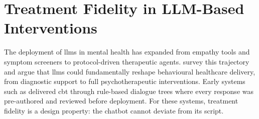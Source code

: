 \section{Treatment Fidelity in LLM-Based Interventions}
\label{sec:bg-llm-healthcare}
%
%
%

The deployment of \glspl{llm} in mental health has expanded from empathy
tools and symptom screeners to protocol-driven therapeutic agents.
\textcite{DTKNEPHQ} survey this trajectory and argue that \glspl{llm} could
fundamentally reshape behavioural healthcare delivery, from diagnostic support
to full psychotherapeutic interventions. Early systems such as 
\parencite{YE8KQTNH} delivered \gls{cbt} through rule-based dialogue trees
where every response was pre-authored and reviewed before deployment. For
these systems, treatment fidelity is a design property: the chatbot cannot
deviate from its script.

